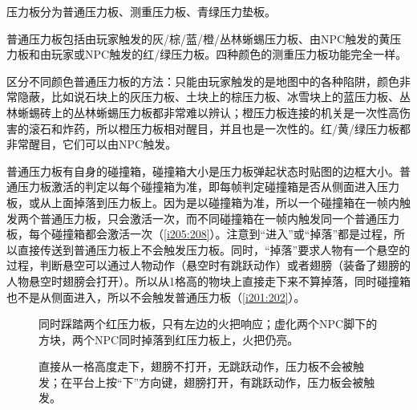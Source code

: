 压力板分为普通压力板、测重压力板、青绿压力垫板。

普通压力板包括由玩家触发的灰/棕/蓝/橙/丛林蜥蜴压力板、由NPC触发的黄压力板和由玩家或NPC触发的红/绿压力板。四种颜色的测重压力板功能完全一样。

\begin{remark*}{}{}
区分不同颜色普通压力板的方法：只能由玩家触发的是地图中的各种陷阱，颜色非常隐蔽，比如说石块上的灰压力板、土块上的棕压力板、冰雪块上的蓝压力板、丛林蜥蜴砖上的丛林蜥蜴压力板都非常难以辨认；橙压力板连接的机关是一次性高伤害的滚石和炸药，所以橙压力板相对醒目，并且也是一次性的。红/黄/绿压力板都非常醒目，它们可以由NPC触发。
\end{remark*}

普通压力板有自身的碰撞箱，碰撞箱大小是压力板弹起状态时贴图的边框大小。普通压力板激活的判定以每个碰撞箱为准，即每帧判定碰撞箱是否从侧面进入压力板，或从上面掉落到压力板上。因为是以碰撞箱为准，所以一个碰撞箱在一帧内触发两个普通压力板，只会激活一次，而不同碰撞箱在一帧内触发同一个普通压力板，每个碰撞箱都会激活一次（\autoref{i205:208}）。注意到“进入”或“掉落”都是过程，所以直接传送到普通压力板上不会触发压力板。同时，“掉落”要求人物有一个悬空的过程，判断悬空可以通过人物动作（悬空时有跳跃动作）或者翅膀（装备了翅膀的人物悬空时翅膀会打开）。所以从1格高的物块上直接走下来不算掉落，同时碰撞箱也不是从侧面进入，所以不会触发普通压力板（\autoref{i201:202}）。

\begin{figure}[!ht]
\begin{center}
\qquad
{}
\end{center}
\caption{\protect{}同时踩踏两个红压力板，只有左边的火把响应；\protect{}虚化两个NPC脚下的方块，两个NPC同时掉落到红压力板上，火把仍亮。}
\label{i205:208}
\end{figure}

\begin{figure}[!ht]
\begin{center}
\qquad
{}
\end{center}
\caption{\protect{}直接从一格高度走下，翅膀不打开，无跳跃动作，压力板不会被触发；\protect{}在平台上按“下”方向键，翅膀打开，有跳跃动作，压力板会被触发。}
\label{i201:202}
\end{figure}

